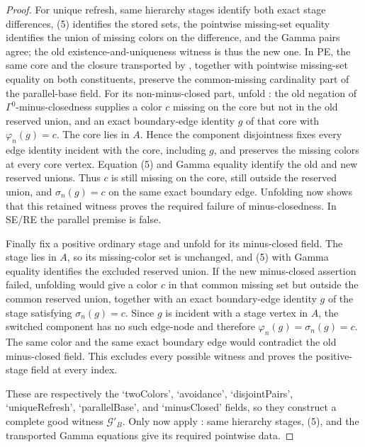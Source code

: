 \begin{proof}
For unique refresh, same hierarchy stages identify both exact stage
differences, (5) identifies the stored sets, the pointwise missing-set
equality identifies the union of missing colors on the difference, and
the Gamma pairs agree; the old existence-and-uniqueness witness is thus
the new one.  In PE, the same core and the closure transported by
, together with pointwise
missing-set equality on both constituents, preserve the common-missing
cardinality part of the parallel-base field.  For its non-minus-closed
part, unfold : the old negation of
$\Gamma^0$-minus-closedness supplies a color $c$ missing on the core but
not in the old reserved union, and an exact boundary-edge identity $g$
of that core with $\varphi_n(g)=c$.  The core lies in $A$.  Hence the
component disjointness fixes every edge identity incident with the core,
including $g$, and preserves the missing colors at every core vertex.
Equation (5) and Gamma equality identify the old and new reserved unions.
Thus $c$ is still missing on the core, still outside the reserved union,
and $\sigma_n(g)=c$ on the same exact boundary edge.  Unfolding
 now shows that this retained witness proves
the required failure of minus-closedness.  In SE/RE the parallel premise
is false.

Finally fix a positive ordinary stage and unfold
 for its minus-closed field.  The stage
lies in $A$, so its missing-color set is unchanged, and (5) with Gamma
equality identifies the excluded reserved union.  If the new
minus-closed assertion failed, unfolding 
would give a color $c$ in that common missing set but outside the common
reserved union, together with an exact boundary-edge identity $g$ of the
stage satisfying $\sigma_n(g)=c$.  Since $g$ is incident with a stage
vertex in $A$, the switched component has no such edge-node and therefore
$\varphi_n(g)=\sigma_n(g)=c$.  The same color and the same exact boundary
edge would contradict the old minus-closed field.  This excludes every
possible witness and proves the positive-stage field at every index.

These are respectively the `twoColors', `avoidance', `disjointPairs',
`uniqueRefresh', `parallelBase', and `minusClosed' fields, so they
construct a complete good witness $\mathcal G'_B$.  Only now apply
: same hierarchy stages, (5), and the
transported Gamma equations give its required pointwise data.


\end{proof}

